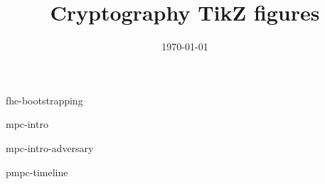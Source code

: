 \documentclass{beamer}
\title{Cryptography TikZ figures}
\date{\today}
\begin{document}
\frame{\titlepage}


\begin{frame}{fhe-bootstrapping}
\vspace{0.2em}
\hspace*{-2.4em}
\centering

\end{frame}


\begin{frame}{mpc-intro}
\centering

\end{frame}


\begin{frame}{mpc-intro-adversary}
\centering

\end{frame}


\begin{frame}{pmpc-timeline}
\centering

\end{frame}
\end{document}
